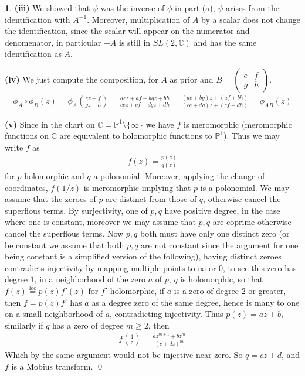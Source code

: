 \documentclass[10.5pt]{article}
\theoremstyle{definition}
\newtheorem{pb}{}
\newcommand{\set}[1]{\{#1\}}
\begin{document}
\begin{pb}
        \textbf{(iii)} We showed that \(\psi\) was the inverse of \(\phi\) in part (a), \(\psi\) arises from the identification with \(A^{-1}\). Moreover, multiplication of \(A\) by a scalar does not change the identification, since the scalar will appear on the numerator and denomenator, in particular \(-A\) is still in \(SL(2,\mathbb{C})\) and has the same identification as \(A\).

        \textbf{(iv)} We just compute the composition, for \(A\) as prior and \(B = \begin{pmatrix} e & f \\ g & h \end{pmatrix}\).
        \begin{align*}
            \phi_A\circ\phi_B(z) = \phi_A\left(\frac{ez + f}{gz + h}\right) = \frac{aez + af + bgz + bh}{cez + cf + dgz + dh} = \frac{(ae + bg)z + (af + bh)}{(ce + dg)z + (cf + dh)} = \phi_{AB}(z)
        \end{align*}

        \textbf{(v)} Since in the chart on \(\mathbb{C} = \mathbb{P}^1\setminus\set{\infty}\) we have \(f\) is meromorphic (meromorphic functions on \(\mathbb{C}\) are equivalent to holomorphic functions to \(\mathbb{P}^1\)). Thus we may write \(f\) as
        \begin{align*}
            f(z) = \frac{p(z)}{q(z)}
        \end{align*}
        for \(p\) holomorphic and \(q\) a polonomial. Moreover, applying the change of coordinates, \(f(1/z)\) is meromorphic implying that \(p\) is a polonomial. We may assume that the zeroes of \(p\) are distinct from those of \(q\), otherwise cancel the superflous terms. By surjectivity, one of \(p,q\) have positive degree, in the case where one is constant, moreover we may assume that \(p,q\) are coprime otherwise cancel the superflous terms. Now \(p,q\) both must have only one distinct zero (or be constant we assume that both \(p,q\) are not constant since the argument for one being constant is a simplified version of the following), having distinct zeroes contradicts injectivity by mapping multiple points to \(\infty\) or \(0\), to see this zero has degree \(1\), in a neighborhood of the zero \(a\) of \(p\), \(q\) is holomorphic, so that \(f(z) \overset{\text{loc}}{=} p(z)f'(z)\) for \(f'\) holomorphic, if \(a\) is a zero of degree \(2\) or greater, then \(f = p(z)f'\) has \(a\) as a degree zero of the same degree, hence is many to one on a small neighborhood of \(a\), contradicting injectivity. Thus \(p(z) = az + b\), similarly if \(q\) has a zero of degree \(m \geq 2\), then
        \begin{align*}
            f(\frac{1}{z}) = \frac{az^{m+1} + bz^m}{(c + dz)^m}
        \end{align*}
        Which by the same argument would not be injective near zero. So \(q = cz + d\), and \(f\) is a Mobius transform. \qed
    \end{pb}
\end{document}
